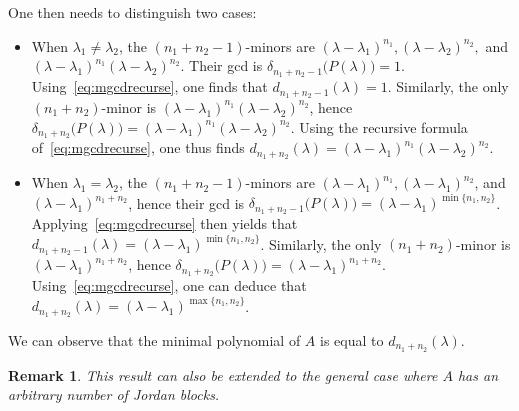 \documentclass[11pt]{article}
\newtheorem*{remark}{Remark}
\begin{document}
One then needs to distinguish two cases:
\begin{itemize}
\item When $\lambda_1 \neq \lambda_2$, the \((n_1 + n_2 - 1)\)-minors are \((\lambda - \lambda_1)^{n_1},(\lambda - \lambda_2)^{n_2},\) and \((\lambda - \lambda_1)^{n_1}(\lambda - \lambda_2)^{n_2}\).
Their gcd is \(\delta_{n_1 + n_2 - 1}\big(P(\lambda)\big) = 1\).
Using~\eqref{eq:mgcdrecurse}, one finds that \(d_{n_1 + n_2 - 1}(\lambda) = 1\).
Similarly, the only \((n_1 + n_2)\)-minor is \((\lambda - \lambda_1)^{n_1}(\lambda - \lambda_2)^{n_2}\), hence \(\delta_{n_1 + n_2}\big(P(\lambda)\big) = (\lambda - \lambda_1)^{n_1}(\lambda - \lambda_2)^{n_2}\).
Using the recursive formula of~\eqref{eq:mgcdrecurse}, one thus finds \(d_{n_1 + n_2}(\lambda) = (\lambda - \lambda_1)^{n_1}(\lambda - \lambda_2)^{n_2}\).
\item When $\lambda_1 = \lambda_2$, the \((n_1 + n_2 - 1)\)-minors are \((\lambda - \lambda_1)^{n_1}, (\lambda - \lambda_1)^{n_2}\), and \((\lambda - \lambda_1)^{n_1 + n_2}\), hence their gcd is \(\delta_{n_1 + n_2 - 1}\big(P(\lambda)\big) = (\lambda - \lambda_1)^{\min\{n_1, n_2\}}\).
Applying~\eqref{eq:mgcdrecurse} then yields that \(d_{n_1 + n_2 - 1}(\lambda) = (\lambda - \lambda_1)^{\min\{n_1, n_2\}}\).
Similarly, the only \((n_1 + n_2)\)-minor is \((\lambda - \lambda_1)^{n_1 + n_2}\), hence \(\delta_{n_1 + n_2}\big(P(\lambda)\big) = (\lambda - \lambda_1)^{n_1 + n_2}\).
Using~\eqref{eq:mgcdrecurse}, one can deduce that \(d_{n_1 + n_2}(\lambda) = (\lambda - \lambda_1)^{\max\{n_1, n_2\}}\).
\end{itemize}

We can observe that the minimal polynomial of $A$ is equal to $d_{n_1+n_2}(\lambda)$.

\begin{remark}
This result can also be extended to the general case where \(A\) has an arbitrary number of Jordan blocks.
\end{remark}
\end{document}

